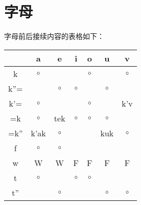 \section{字母}

字母前后接续内容的表格如下：

\begin{tabular}{c|cccccc}
     & a & e & i & o & u & v \\
\hline
k   & $\circ$ & & & $\circ$ & & $\circ$ \\
k''= & & $\circ$ & $\circ$ & & $\circ$ \\
k'=  & $\circ$ & & & $\circ$ & & k'v\\
\hline
=k   & $\circ$ & tek &$\circ$&$\circ$&$\circ$\\
=k'' & k'ak & $\circ$ & & & kuk & $\circ$ \\
\hline
f    & $\circ$ & $\circ$ \\
w    & W & W & F & F & F & F\\
\hline
t    & $\circ$ & & $\circ$ & $\circ$\\
t''  & & $\circ$ & & & $\circ$ & $\circ$
\end{tabular}